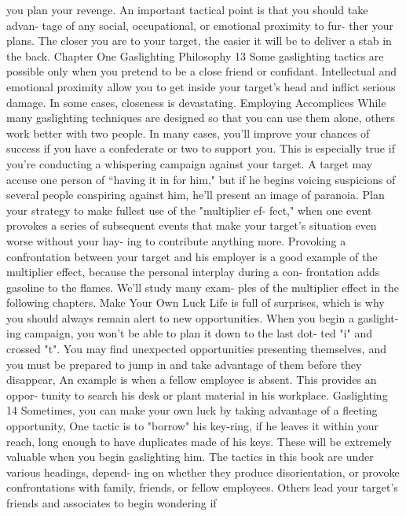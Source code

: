 \documentclass{book}
\begin{document}
you plan your revenge. 
An important tactical point is that you should take advan- 
tage of any social, occupational, or emotional proximity to fur- 
ther your plans. The closer you are to your target, the easier it 
will be to deliver a stab in the back. 
Chapter One 
Gaslighting Philosophy 
13 
Some gaslighting tactics are possible only when you pretend 
to be a close friend or confidant. Intellectual and emotional 
proximity allow you to get inside your target's head and inflict 
serious damage. In some cases, closeness is devastating. 
Employing Accomplices 
While many gaslighting techniques are designed so that you 
can use them alone, others work better with two people. In 
many cases, you'll improve your chances of success if you have 
a confederate or two to support you. This is especially true if 
you're conducting a whispering campaign against your target. A 
target may accuse one person of “having it in for him," but if he 
begins voicing suspicions of several people conspiring against 
him, he'll present an image of paranoia. 
Plan your strategy to make fullest use of the "multiplier ef- 
fect," when one event provokes a series of subsequent events 
that make your target's situation even worse without your hay- 
ing to contribute anything more. Provoking a confrontation 
between your target and his employer is a good example of the 
multiplier effect, because the personal interplay during a con- 
frontation adds gasoline to the flames. We'll study many exam- 
ples of the multiplier effect in the following chapters. 
Make Your Own Luck 
Life is full of surprises, which is why you should always 
remain alert to new opportunities. When you begin a gaslight- 
ing campaign, you won't be able to plan it down to the last dot- 
ted "i" and crossed "t". You may find unexpected opportunities 
presenting themselves, and you must be prepared to jump in 
and take advantage of them before they disappear, An example 
is when a fellow employee is absent. This provides an oppor- 
tunity to search his desk or plant material in his workplace.  Gaslighting 
14 
Sometimes, you can make your own luck by taking advantage 
of a fleeting opportunity, One tactic is to "borrow" his key-ring, 
if he leaves it within your reach, long enough to have duplicates 
made of his keys. These will be extremely valuable when you 
begin gaslighting him. 
The tactics in this book are under various headings, depend- 
ing on whether they produce disorientation, or provoke 
confrontations with family, friends, or fellow employees. Others 
lead your target's friends and associates to begin wondering if 
\end{document}
